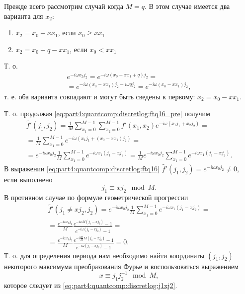 Прежде всего рассмотрим случай когда $M = q$. В этом случае имеется
два варианта для $x_2$:  
\begin{enumerate}
\item $x_2 = x_0 - x x_1$, если $x_0 \ge x x_1$
\item $x_2 = x_0 + q - x x_1$, если $x_0 < x x_1$
\end{enumerate}
Т. о.
\begin{eqnarray}
e^{-i \omega x_2j_2} = e^{-i \omega\left(x_0 - x x_1 + q\right) j_2} = 
\nonumber \\
= e^{-i \omega\left(x_0 - x x_1\right) j_2 - i \omega q j_2} = 
e^{-i \omega\left(x_0 - x x_1\right) j_2},
\nonumber
\end{eqnarray}
т. е. оба варианта совпадают и могут быть сведены к первому:
$x_2 = x_0 - x x_1$.

Т. о. продолжая \eqref{eq:part4:quantcomp:discretlog:ftq16_pre} получим
\begin{eqnarray}
\tilde{f'}\left(j_1, j_2\right) = 
\frac{1}{M}\sum_{x_1 = 0}^{M-1}\sum_{x_2 = 0}^{M-1} 
f'\left(x_1, x_2\right)e^{-i \omega\left(x_1 j_1 + x_2j_2\right)} =
\nonumber \\
=
 \frac{1}{M}\sum_{x_1 = 0}^{M-1}
e^{-i \omega\left(x_1 j_1 + (x_0 - x
   x_1) j_2\right)} = 
\nonumber \\
= e^{-i \omega x_0 j_2}\frac{1}{M}\sum_{x_1 = 0}^{M-1}
e^{-i  \omega x_1 \left(j_1 - x j_2\right)} =
\frac{1}{M} e^{-i \omega x_0 j_2} 
\sum_{x_1 = 0}^{M-1} e^{-i  \omega x_1 \left(j_1 - x j_2\right)}.
\label{eq:part4:quantcomp:discretlog:ftq16}
\end{eqnarray}
В выражении
\eqref{eq:part4:quantcomp:discretlog:ftq16} $\tilde{f'}(j_1, j_2) =
e^{-i \omega x_0 j_2} \ne 0$, если выполнено 
\begin{equation}
j_1 \equiv x j_2 \mod M.
\label{eq:part4:quantcomp:discretlog:j1xj2}
\end{equation} 
В противном случае по формуле геометрической прогрессии 
\begin{eqnarray}
\tilde{f'}\left(j_1 \ne x j_2, j_2\right) = 
e^{-i \omega x_0 j_2}\frac{1}{M}
\sum_{x_1 = 0}^{M-1}e^{-i
  \omega x_1 \left(j_1 - x j_2\right)} = 
\nonumber \\
=
\frac{e^{-i \omega x_0 j_2}}{M} \frac{e^{-i
  \omega M \left(j_1 - x j_2\right)} - 1}{e^{-i
  \omega \left(j_1 - x j_2\right)} - 1} = 
\nonumber \\
=
 \frac{e^{-i \omega x_0 j_2}}{M} 
\frac{e^{-i \frac{2 \pi}{M} M \left(j_1 - x j_2\right)} - 1}{e^{-i
  \omega \left(j_1 - x j_2\right)} - 1} = 0.
\nonumber
\end{eqnarray} 
Т. о. для определения периода нам необходимо найти координаты $(j_1, j_2)$
некоторого максимума преобразования Фурье и воспользоваться выражением 
\begin{equation}
x \equiv j_1 j_2^{-1} \mod M,
\label{eq:part4:quantcomp:discretlog:periodfourier}
\end{equation}
которое следует из \eqref{eq:part4:quantcomp:discretlog:j1xj2}.

